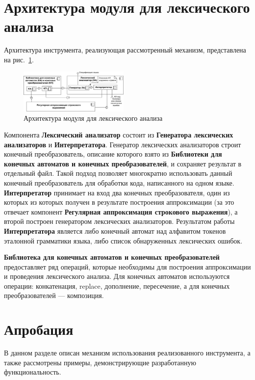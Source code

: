 \documentclass[10pt, conference, compsocconf]{IEEEtran}
\begin{document}
\section{Архитектура модуля для лексического анализа}
Архитектура инструмента, реализующая рассмотренный механизм, представлена на рис.~\ref{fig:ComponentDiagram_rus}. 

\begin{figure}[H]
\centering
\includegraphics[width=0.48\textwidth]{pics/architecture_module}
\caption{Архитектура модуля для лексического анализа}
\label{fig:ComponentDiagram_rus}
\end{figure}

Компонента \textbf{Лексический анализатор} состоит из \textbf{Генератора лексических анализаторов} и \textbf{Интерпретатора}. Генератор лексических анализаторов строит конечный преобразователь, описание которого взято из \textbf{Библиотеки для конечных автоматов и конечных преобразователей}, и сохраняет результат в отдельный файл. Такой подход позволяет многократно использовать данный конечный преобразователь для обработки кода, написанного на одном языке. \textbf{Интерпретатор} принимает на вход два конечных преобразователя, один из которых из которых получен в результате построения аппроксимации (за это отвечает компонент \textbf{Регулярная аппроксимация строкового выражения}), а второй построен генератором лексических анализаторов. Результатом работы \textbf{Интерпретатора} является либо конечный автомат над алфавитом токенов эталонной грамматики языка, либо список обнаруженных лексических ошибок. 

\textbf{Библиотека для конечных автоматов и конечных преобразователей} предоставляет ряд операций, которые необходимы для построения аппроксимации и проведения лексического анализа. Для конечных автоматов используются операции: конкатенация, replace, дополнение, пересечение,  а для конечных преобразователей --- композиция. 

\section{Апробация}

В данном разделе описан механизм использования реализованного инструмента, а также рассмотрены примеры, демонстрирующие разработанную функциональность.
\end{document}
